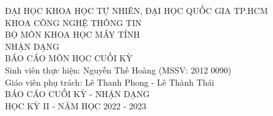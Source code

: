 \documentclass[12pt, a4paper]{article}
\begin{document}
	

	\begin{titlepage}
		\centering
		\large
		ĐẠI HỌC KHOA HỌC TỰ NHIÊN, ĐẠI HỌC QUỐC GIA TP.HCM\\[.1in]
		KHOA CÔNG NGHỆ THÔNG TIN\\BỘ MÔN KHOA HỌC MÁY TÍNH\\
		\vfill
		\huge NHẬN DẠNG\\
		\LARGE BÁO CÁO MÔN HỌC CUỐI KỲ\\[.2in]
		\vfill
		\RaggedRight
		\large
		Sinh viên thực hiện: Nguyễn Thế Hoàng (MSSV: 2012 0090)\\[.1in]
		Giáo viên phụ trách: Lê Thanh Phong - Lê Thành Thái\\[.2in]
		\Centering
		BÁO CÁO CUỐI KỲ - NHẬN DẠNG\\[.1in]
		HỌC KỲ II - NĂM HỌC 2022 - 2023
	\end{titlepage}
	
	\newpage	
	
	
	 \bigskip
	 \bigskip
	 \bigskip
	 \bigskip
	 \clearpage
	 \bigskip
	 \clearpage
	
	\printbibliography
	
\end{document}
